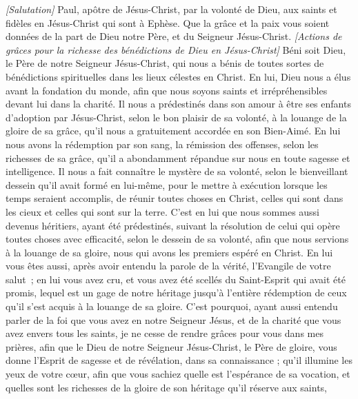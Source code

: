\BFont
\begin{multicols}{2}
\textit{[Salutation]}
\VerseOne{}Paul, apôtre de Jésus-Christ, par la volonté de Dieu, aux saints et fidèles en Jésus-Christ qui sont à Ephèse.
Que la grâce et la paix vous soient données de la part de Dieu notre Père, et du Seigneur Jésus-Christ.
\textit{[Actions de grâces pour la richesse des bénédictions de Dieu en Jésus-Christ]}
Béni soit Dieu, le Père de notre Seigneur Jésus-Christ, qui nous a bénis de toutes sortes de bénédictions spirituelles dans les lieux célestes en Christ.
En lui, Dieu nous a élus avant la fondation du monde, afin que nous soyons saints et irrépréhensibles devant lui dans la charité.
Il nous a prédestinés dans son amour à être ses enfants d’adoption par Jésus-Christ, selon le bon plaisir de sa volonté,
à la louange de la gloire de sa grâce, qu’il nous a gratuitement accordée en son Bien-Aimé.
En lui nous avons la rédemption par son sang, la rémission des offenses, selon les richesses de sa grâce,
qu’il a abondamment répandue sur nous en toute sagesse et intelligence.
Il nous a fait connaître le mystère de sa volonté, selon le bienveillant dessein qu’il avait formé en lui-même,
pour le mettre à exécution lorsque les temps seraient accomplis, de réunir toutes choses en Christ, celles qui sont dans les cieux et celles qui sont sur la terre.
C’est en lui que nous sommes aussi devenus héritiers, ayant été prédestinés, suivant la résolution de celui qui opère toutes choses avec efficacité, selon le dessein de sa volonté,
afin que nous servions à la louange de sa gloire, nous qui avons les premiers espéré en Christ.
En lui vous êtes aussi, après avoir entendu la parole de la vérité, l'Evangile de votre salut ; en lui vous avez cru, et vous avez été scellés du Saint-Esprit qui avait été promis,
lequel est un gage de notre héritage jusqu'à l’entière rédemption de ceux qu'il s’est acquis à la louange de sa gloire.
C'est pourquoi, ayant aussi entendu parler de la foi que vous avez en notre Seigneur Jésus, et de la charité que vous avez envers tous les saints,
je ne cesse de rendre grâces pour vous dans mes prières,
afin que le Dieu de notre Seigneur Jésus-Christ, le Père de gloire, vous donne l'Esprit de sagesse et de révélation, dans sa connaissance ;
qu'il illumine les yeux de votre cœur, afin que vous sachiez quelle est l'espérance de sa vocation, et quelles sont les richesses de la gloire de son héritage qu’il réserve aux saints,

\end{multicols}
